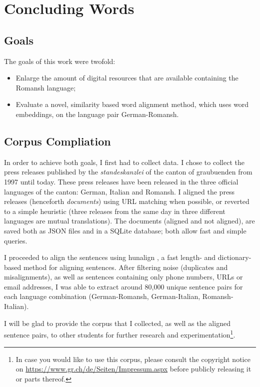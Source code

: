 \chapter{Concluding Words}\label{chap:summary}

\section{Goals}
The goals of this work were twofold: 
\begin{itemize}
	\item Enlarge the amount of digital resources that are available containing the Romansh language;
	\item Evaluate a novel, similarity based word alignment method, which uses word embeddings, on the language pair German-Romansh.
\end{itemize}


\section{Corpus Compliation}
In order to achieve both goals, I first had to collect data. 
I chose to collect the press releases published by the \emph{\Gls{standeskanzlei}} of the canton of \Gls{graubuenden} from 1997 until today. 
These press releases have been released in the three official languages of the canton: German, Italian and Romansh. 
I aligned the press releases (henceforth \emph{documents}) using URL matching when possible, or reverted to a simple heuristic (three releases from the same day in three different languages are mutual translations).
The documents (aligned and not aligned), are saved both as \acrshort{JSON} files and in a SQLite database; both allow  fast and simple queries.

I  proceeded to align the sentences using hunalign \autocite{hunalign}, a fast length- and dictionary-based method for aligning sentences. 
After filtering noise (duplicates and misalignments), as well as sentences containing only phone numbers, \acrshort{URL}s or email addresses, I was able to extract around 80,000 unique sentence pairs for each language combination (German-Romansh, German-Italian, Romansh-Italian).

I will be glad to provide  the corpus that I collected, as well as the aligned sentence pairs, to other students for further research and experimentation{\footnote{In case you would like to use this corpus, please consult the copyright notice on \url{https://www.gr.ch/de/Seiten/Impressum.aspx} before publicly releasing it or parts thereof.}}. 

